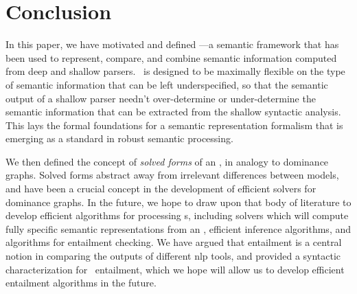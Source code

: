 \section{Conclusion}
\label{sec:conclusion}

In this paper, we have motivated and defined \rmrs---a semantic
framework that has been used to represent, compare, and combine
semantic information computed from deep and shallow parsers.  \rmrs\
is designed to be maximally flexible on the type of semantic
information that can be left underspecified, so that
the semantic output of a shallow parser needn't over-determine or
under-determine the semantic information that can be extracted from
the shallow syntactic analysis.  This lays the formal foundations for
a semantic representation formalism that is emerging as a standard in
robust semantic processing.

We then defined the concept of \emph{solved forms} of an \rmrs, in
analogy to dominance graphs.  Solved forms abstract away from
irrelevant differences between models, and have been a crucial concept
in the development of efficient solvers for dominance graphs.  In the
future, we hope to draw upon that body of literature to develop
efficient algorithms for processing \rmrs s, including solvers which
will compute fully specific semantic representations from an \rmrs,
efficient inference algorithms, and algorithms for entailment
checking.  We have argued that entailment is a central notion in
comparing the outputs of different {\sc nlp} tools, and provided a syntactic
characterization for \rmrs\ entailment, which we hope will allow us to
develop efficient entailment algorithms in the future.


